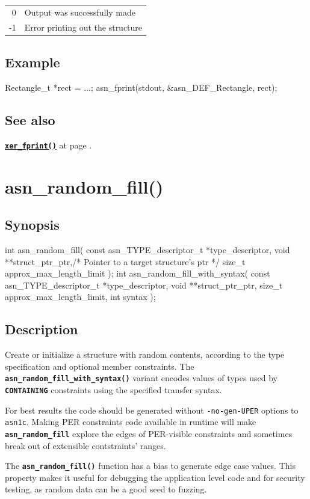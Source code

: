 \documentclass[english,oneside,12pt]{book}
\newcommand{\apisection}[2]{\clearpage\section{\label{#1}#2}}
\newcommand{\api}[2]{\hyperref[#1]{\code{#2}}}
\newcommand{\seealso}[2]{\api{#1}{#2} at page \pageref{#1}}
\newcommand{\code}[1]{\texttt{\textbf{\lstinline{#1}}}}
\newcommand{\cmd}[1]{\texttt{#1}}
\begin{document}
\begin{tabular}[h!]{rl}
0 & Output was successfully made \\
-1 & Error printing out the structure
\end{tabular}

\subsection*{Example}
\begin{example}
Rectangle_t *rect = ...;
asn_fprint(stdout, &asn_DEF_Rectangle, rect);
\end{example}

\subsection*{See also}
\seealso{sec:xer_fprint}{xer_fprint()}.

\apisection{sec:asn_random_fill}{asn\_random\_fill()}

\subsection*{Synopsis}
\begin{signature}
int asn_random_fill(
    const asn_TYPE_descriptor_t *type_descriptor,
    void **struct_ptr_ptr,/* Pointer to a target structure's ptr */
    size_t approx_max_length_limit
);
int asn_random_fill_with_syntax(
    const asn_TYPE_descriptor_t *type_descriptor,
    void **struct_ptr_ptr,
    size_t approx_max_length_limit, int syntax
);
\end{signature}

\subsection*{Description}

Create or initialize a structure with random contents, according to the type
specification and optional member constraints.
The \code{asn_random_fill_with_syntax()} variant encodes values of types used
by \code{CONTAINING} constraints using the specified transfer syntax.

For best results the code should be generated without \cmd{-no-gen-UPER}
options to \cmd{asn1c}. Making PER constraints code available in runtime
will make \code{asn_random_fill} explore the edges of PER-visible constraints
and sometimes break out of extensible contstraints' ranges.

The \code{asn_random_fill()} function has a bias to generate edge case
values. This property makes it useful for debugging the application level
code and for security testing, as random data can be a good seed to fuzzing.
\end{document}
